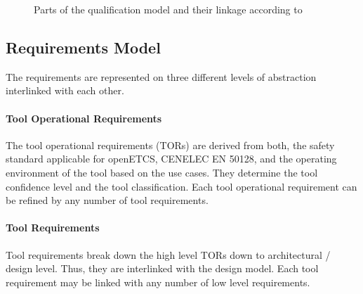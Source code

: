 \begin{figure}
\begin{center}
\end{center}
\caption{Parts of the qualification model and their linkage according to \cite{slotosch_model-based_2012}}
\label{fig:qualification-models-linkage}
\end{figure}

\subsection{Requirements Model}

The requirements are represented on three different levels of abstraction interlinked with each other.

\paragraph{Tool Operational Requirements}
The tool operational requirements (TORs) are derived from both, the safety standard applicable for openETCS, CENELEC EN 50128, and the operating environment of the tool based on the use cases. They determine the tool confidence level and the tool classification. Each tool operational requirement can be refined by any number of tool requirements. 

\paragraph{Tool Requirements}
Tool requirements break down the high level TORs down to architectural / design level. Thus, they are interlinked with the design model. Each tool requirement may be linked with any number of low level requirements. 

